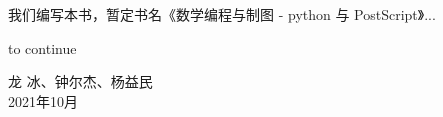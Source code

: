 \documentclass[main.tex]{subfiles}
\begin{document}
我们编写本书，暂定书名《数学编程与制图 - python 与 PostScript》...

to continue
\begin{flushright}
龙 冰、钟尔杰、杨益民\\
2021年10月
\end{flushright}
\end{document}
